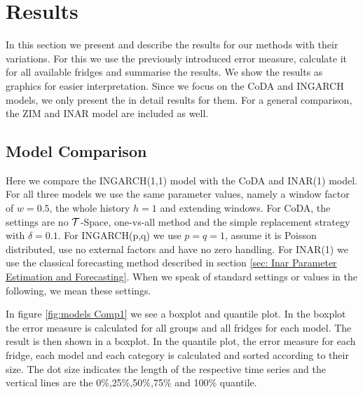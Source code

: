 \section{Results}
\label{sec:Results}

In this section we present and describe the results for our methods with their variations. For this we use the previously introduced error measure, calculate it for all available fridges and summarise the results. We show the results as graphics for easier interpretation. Since we focus on the CoDA and INGARCH models, we only present the in detail results for them. For a general comparison, the ZIM and INAR model are included as well. 

\subsection{Model Comparison}
\label{sec: Model Comparison}

Here we compare the INGARCH(1,1) model with the CoDA and INAR(1) model. For all three models we use the same parameter values, namely a window factor of $w=0.5$, the whole history $h=1$ and extending windows. For CoDA, the settings are no $\mathcal{T}$-Space, one-vs-all method and the simple replacement strategy with $\delta=0.1$. For INGARCH(p,q) we use $p=q=1$, assume it is Poisson distributed, use no external factors and have no zero handling. For INAR(1) we use the classical forecasting method described in section \ref{sec: Inar Parameter Estimation and Forecasting}. When we speak of standard settings or values in the following, we mean these settings. 

In figure \ref{fig:models Comp1} we see a boxplot and quantile plot. In the boxplot the error measure is calculated for all groups and all fridges for each model. The result is then shown in a boxplot. In the quantile plot, the error measure for each fridge, each model and each category is calculated and sorted according to their size. The dot size indicates the length of the respective time series and the vertical lines are the 0\%,25\%,50\%,75\% and 100\% quantile.

